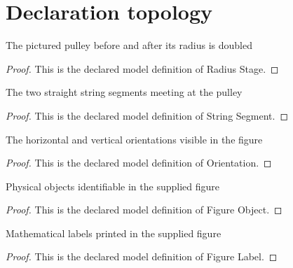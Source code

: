 \section{Declaration topology}
\begin{definition}
  \label{def:physics:phyx-mini-0235:phyxminiproblems-problemphyxmini0235-radiusstage}
  The pictured pulley before and after its radius is doubled
\end{definition}
\begin{proof}
  This is the declared model definition of Radius Stage.
\end{proof}
\begin{definition}
  \label{def:physics:phyx-mini-0235:phyxminiproblems-problemphyxmini0235-stringsegment}
  The two straight string segments meeting at the pulley
\end{definition}
\begin{proof}
  This is the declared model definition of String Segment.
\end{proof}
\begin{definition}[Orientation]
  \label{def:physics:phyx-mini-0235:phyxminiproblems-problemphyxmini0235-orientation}
  The horizontal and vertical orientations visible in the figure
\end{definition}
\begin{proof}
  This is the declared model definition of Orientation.
\end{proof}
\begin{definition}
  \label{def:physics:phyx-mini-0235:phyxminiproblems-problemphyxmini0235-figureobject}
  Physical objects identifiable in the supplied figure
\end{definition}
\begin{proof}
  This is the declared model definition of Figure Object.
\end{proof}
\begin{definition}
  \label{def:physics:phyx-mini-0235:phyxminiproblems-problemphyxmini0235-figurelabel}
  Mathematical labels printed in the supplied figure
\end{definition}
\begin{proof}
  This is the declared model definition of Figure Label.
\end{proof}
